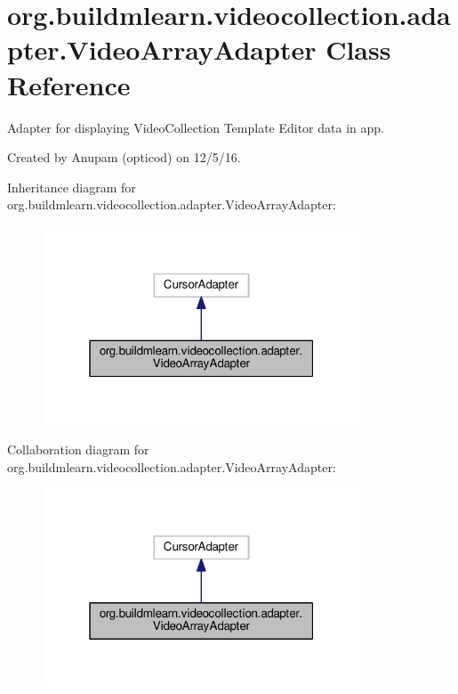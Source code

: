 \hypertarget{classorg_1_1buildmlearn_1_1videocollection_1_1adapter_1_1VideoArrayAdapter}{}\section{org.\+buildmlearn.\+videocollection.\+adapter.\+Video\+Array\+Adapter Class Reference}
\label{classorg_1_1buildmlearn_1_1videocollection_1_1adapter_1_1VideoArrayAdapter}


Adapter for displaying Video\+Collection Template Editor data in app. 

Created by Anupam (opticod) on 12/5/16.  




Inheritance diagram for org.\+buildmlearn.\+videocollection.\+adapter.\+Video\+Array\+Adapter\+:
\nopagebreak
\begin{figure}[H]
\begin{center}
\leavevmode
\includegraphics[width=268pt]{classorg_1_1buildmlearn_1_1videocollection_1_1adapter_1_1VideoArrayAdapter__inherit__graph}
\end{center}
\end{figure}


Collaboration diagram for org.\+buildmlearn.\+videocollection.\+adapter.\+Video\+Array\+Adapter\+:
\nopagebreak
\begin{figure}[H]
\begin{center}
\leavevmode
\includegraphics[width=268pt]{classorg_1_1buildmlearn_1_1videocollection_1_1adapter_1_1VideoArrayAdapter__coll__graph}
\end{center}
\end{figure}
